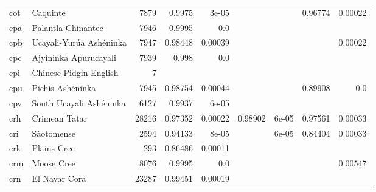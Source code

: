 \documentclass[11pt]{article}
\begin{document}
\begin{table*}[h]
{\begin{tabular}{llrrrrrrr}
cot         & Caquinte         & 7879         & 0.9975         & 3e-05         &          &          & 0.96774         & 0.00022         \\

cpa         & Palantla Chinantec         & 7946         & 0.9995         & 0.0         &          &          &          &          \\

cpb         & Ucayali-Yurúa Ashéninka         & 7947         & 0.98448         & 0.00039         &          &          &          & 0.00022         \\

cpc         & Ajyíninka Apurucayali         & 7939         & 0.998         & 0.0         &          &          &          &          \\

cpi         & Chinese Pidgin English         & 7         &          &          &          &          &          &          \\

cpu         & Pichis Ashéninka         & 7945         & 0.98754         & 0.00044         &          &          & 0.89908         & 0.0         \\

cpy         & South Ucayali Ashéninka         & 6127         & 0.9937         & 6e-05         &          &          &          &          \\

crh         & Crimean Tatar         & 28216         & 0.97352         & 0.00022         & 0.98902         & 6e-05         & 0.97561         & 0.00033         \\

cri         & Sãotomense         & 2594         & 0.94133         & 8e-05         &          & 6e-05         & 0.84404         & 0.00033         \\

crk         & Plains Cree         & 293         & 0.86486         & 0.00011         &          &          &          &          \\

crm         & Moose Cree         & 8076         & 0.9995         & 0.0         &          &          &          & 0.00547         \\

crn         & El Nayar Cora         & 23287         & 0.99451         & 0.00019         &          &          &          &          \\


\end{tabular}}
\end{table*}
\end{document}
